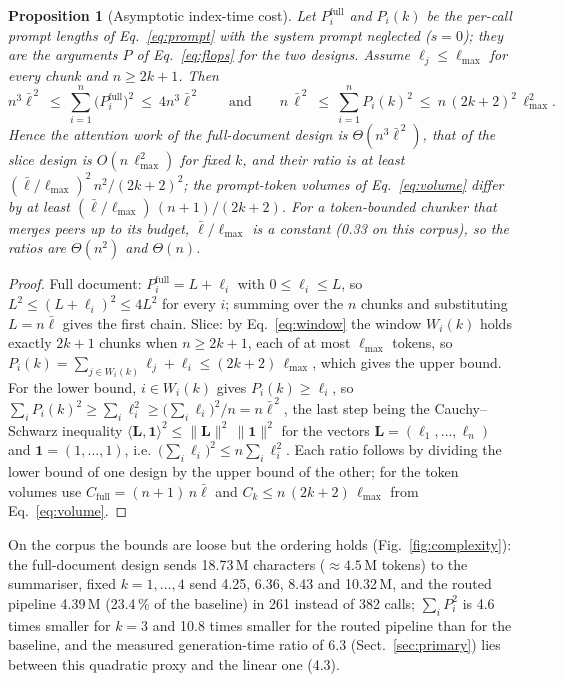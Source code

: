 \documentclass[pdflatex,sn-mathphys-num]{sn-jnl}
\theoremstyle{thmstyleone}%
\newtheorem{proposition}[theorem]{Proposition}%
\theoremstyle{thmstylethree}%
\begin{document}
\begin{proposition}[Asymptotic index-time cost]\label{prop:complexity}
Let $P_i^{\mathrm{full}}$ and $P_i(k)$ be the per-call prompt lengths of Eq.~\eqref{eq:prompt} with the system prompt neglected ($s=0$); they are the arguments $P$ of Eq.~\eqref{eq:flops} for the two designs. Assume $\ell_j\le\ell_{\max}$ for every chunk and $n\ge 2k+1$. Then
\begin{equation*}
n^{3}\bar\ell^{\,2}\ \le\ \sum_{i=1}^{n}\bigl(P_i^{\mathrm{full}}\bigr)^{2}\ \le\ 4n^{3}\bar\ell^{\,2}
\qquad\text{and}\qquad
n\,\bar\ell^{\,2}\ \le\ \sum_{i=1}^{n}P_i(k)^{2}\ \le\ n\,(2k+2)^{2}\,\ell_{\max}^{2}.
\end{equation*}
Hence the attention work of the full-document design is $\Theta(n^{3}\bar\ell^{\,2})$, that of the slice design is $O(n\,\ell_{\max}^{2})$ for fixed $k$, and their ratio is at least $(\bar\ell/\ell_{\max})^{2}\,n^{2}/(2k+2)^{2}$; the prompt-token volumes of Eq.~\eqref{eq:volume} differ by at least $(\bar\ell/\ell_{\max})\,(n+1)/(2k+2)$. For a token-bounded chunker that merges peers up to its budget, $\bar\ell/\ell_{\max}$ is a constant (0.33 on this corpus), so the ratios are $\Theta(n^{2})$ and $\Theta(n)$.
\end{proposition}
\begin{proof}
Full document: $P_i^{\mathrm{full}}=L+\ell_i$ with $0\le\ell_i\le L$, so $L^{2}\le(L+\ell_i)^{2}\le 4L^{2}$ for every $i$; summing over the $n$ chunks and substituting $L=n\bar\ell$ gives the first chain. Slice: by Eq.~\eqref{eq:window} the window $W_i(k)$ holds exactly $2k+1$ chunks when $n\ge 2k+1$, each of at most $\ell_{\max}$ tokens, so $P_i(k)=\sum_{j\in W_i(k)}\ell_j+\ell_i\le(2k+2)\,\ell_{\max}$, which gives the upper bound. For the lower bound, $i\in W_i(k)$ gives $P_i(k)\ge\ell_i$, so $\sum_i P_i(k)^{2}\ge\sum_i\ell_i^{2}\ge\bigl(\sum_i\ell_i\bigr)^{2}/n=n\bar\ell^{\,2}$, the last step being the Cauchy--Schwarz inequality $\langle\mathbf L,\mathbf 1\rangle^{2}\le\lVert\mathbf L\rVert^{2}\,\lVert\mathbf 1\rVert^{2}$ for the vectors $\mathbf L=(\ell_1,\dots,\ell_n)$ and $\mathbf 1=(1,\dots,1)$, i.e.\ $\bigl(\sum_i\ell_i\bigr)^{2}\le n\sum_i\ell_i^{2}$. Each ratio follows by dividing the lower bound of one design by the upper bound of the other; for the token volumes use $C_{\mathrm{full}}=(n+1)\,n\bar\ell$ and $C_k\le n\,(2k+2)\,\ell_{\max}$ from Eq.~\eqref{eq:volume}.
\end{proof}

On the corpus the bounds are loose but the ordering holds (Fig.~\ref{fig:complexity}): the full-document design sends 18.73\,M characters ($\approx 4.5$\,M tokens) to the summariser, fixed $k=1,\dots,4$ send 4.25, 6.36, 8.43 and 10.32\,M, and the routed pipeline 4.39\,M (23.4\,\% of the baseline) in 261 instead of 382 calls; $\sum_i P_i^2$ is 4.6 times smaller for $k=3$ and 10.8 times smaller for the routed pipeline than for the baseline, and the measured generation-time ratio of 6.3 (Sect.~\ref{sec:primary}) lies between this quadratic proxy and the linear one (4.3).
\end{document}
